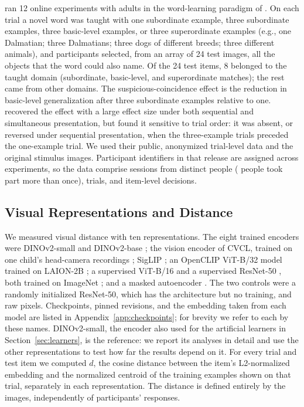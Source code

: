 \documentclass[11pt]{article}
\begin{document}
\textcite{lewis2018} ran 12 online experiments with adults in the word-learning paradigm of \textcite{xu2007}. On each trial a novel word was taught with one subordinate example, three subordinate examples, three basic-level examples, or three superordinate examples (e.g., one Dalmatian; three Dalmatians; three dogs of different breeds; three different animals), and participants selected, from an array of 24 test images, all the objects that the word could also name. Of the 24 test items, 8 belonged to the taught domain (subordinate, basic-level, and superordinate matches); the rest came from other domains. The suspicious-coincidence effect is the reduction in basic-level generalization after three subordinate examples relative to one. \textcite{lewis2018} recovered the effect with a large effect size under both sequential and simultaneous presentation, but found it sensitive to trial order: it was absent, or reversed under sequential presentation, when the three-example trials preceded the one-example trial. We used their public, anonymized trial-level data and the original stimulus images. Participant identifiers in that release are assigned across experiments, so the data comprise \HFourSessions{} sessions from \HFourPersons{} distinct people (\HFourRepeaters{} people took part more than once), \HFourTrials{} trials, and \HFourNobs{} item-level decisions.

\subsection{Visual Representations and Distance}

We measured visual distance with ten representations. The eight trained encoders were DINOv2-small and DINOv2-base \parencite{oquab2023}; the vision encoder of CVCL, trained on one child's head-camera recordings \parencite{vong2024}; SigLIP \parencite{zhai2023}; an OpenCLIP ViT-B/32 model trained on LAION-2B \parencite{cherti2023,schuhmann2022}; a supervised ViT-B/16 \parencite{dosovitskiy2020} and a supervised ResNet-50 \parencite{he2016}, both trained on ImageNet \parencite{deng2009}; and a masked autoencoder \parencite[MAE;][]{he2022}. The two controls were a randomly initialized ResNet-50, which has the architecture but no training, and raw pixels. Checkpoints, pinned revisions, and the embedding taken from each model are listed in Appendix~\ref{app:checkpoints}; for brevity we refer to each by these names. DINOv2-small, the encoder also used for the artificial learners in Section~\ref{sec:learners}, is the reference: we report its analyses in detail and use the other representations to test how far the results depend on it. For every trial and test item we computed $d$, the cosine distance between the item's L2-normalized embedding and the normalized centroid of the training examples shown on that trial, separately in each representation. The distance is defined entirely by the images, independently of participants' responses.
\end{document}
